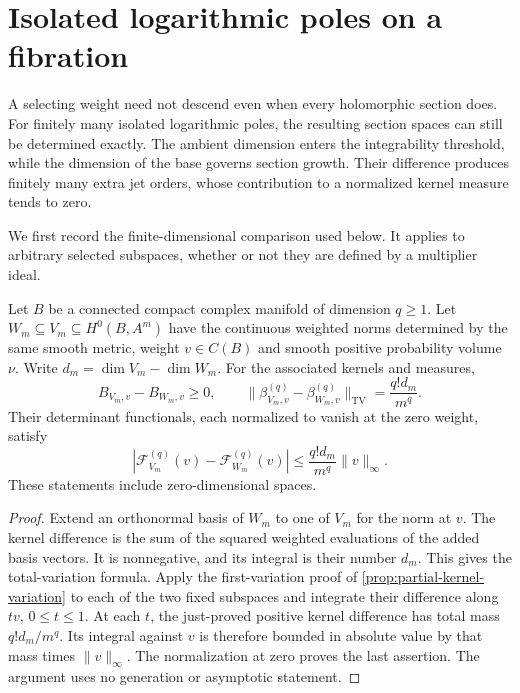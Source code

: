 \section{Isolated logarithmic poles on a fibration}
\label{sec:fiber-point-kernels}

A selecting weight need not descend even when every holomorphic section does. For finitely many isolated logarithmic poles, the resulting section spaces can still be determined exactly. The ambient dimension enters the integrability threshold, while the dimension of the base governs section growth. Their difference produces finitely many extra jet orders, whose contribution to a normalized kernel measure tends to zero.

We first record the finite-dimensional comparison used below. It applies to arbitrary selected subspaces, whether or not they are defined by a multiplier ideal.

\begin{lemma}\label{lem:kernel-codimension-comparison}
Let $B$ be a connected compact complex manifold of dimension $q\geq1$. Let $W_m\subseteq V_m\subseteq H^0(B,A^m)$ have the continuous weighted norms determined by the same smooth metric, weight $v\in C(B)$ and smooth positive probability volume $\nu$. Write $d_m=\dim V_m-\dim W_m$. For the associated kernels and measures,
\[
 B_{V_m,v}-B_{W_m,v}\geq0,\qquad
 \|\beta_{V_m,v}^{(q)}-\beta_{W_m,v}^{(q)}\|_{\mathrm{TV}}
       =\frac{q!d_m}{m^q}.
\]
Their determinant functionals, each normalized to vanish at the zero weight, satisfy
\[
 |\mathcal F_{V_m}^{(q)}(v)-\mathcal F_{W_m}^{(q)}(v)|
       \leq\frac{q!d_m}{m^q}\|v\|_\infty.
\]
These statements include zero-dimensional spaces.
\end{lemma}
\begin{proof}
Extend an orthonormal basis of $W_m$ to one of $V_m$ for the norm at $v$. The kernel difference is the sum of the squared weighted evaluations of the added basis vectors. It is nonnegative, and its integral is their number $d_m$. This gives the total-variation formula. Apply the first-variation proof of \cref{prop:partial-kernel-variation} to each of the two fixed subspaces and integrate their difference along $tv$, $0\leq t\leq1$. At each $t$, the just-proved positive kernel difference has total mass $q!d_m/m^q$. Its integral against $v$ is therefore bounded in absolute value by that mass times $\|v\|_\infty$. The normalization at zero proves the last assertion. The argument uses no generation or asymptotic statement.
\end{proof}

